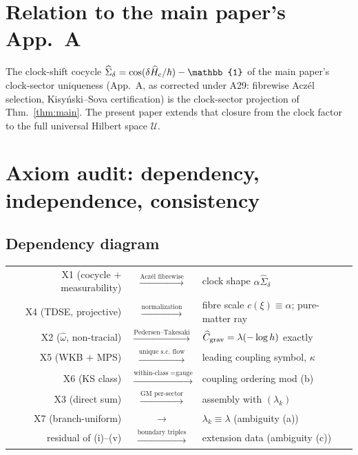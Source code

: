 \documentclass[11pt,a4paper]{article}
\theoremstyle{definition}
\theoremstyle{remark}
\newcommand{\id}{\mathbb{1}}
\begin{document}
\section{Relation to the main paper's App.~A}
\label{sec:vs-kisynski}

The clock-shift cocycle $\widehat\Sigma_\delta=
\cos(\delta\widehat H_{\rm c}/\hbar)-\id$ of the main paper's
clock-sector uniqueness (App.~A, as corrected under A29:
fibrewise Acz\'el selection, Kisy\'nski--Sova certification) is
the clock-sector projection of Thm.~\ref{thm:main}. The present
paper extends that closure from the clock factor to the full
universal Hilbert space $\mathcal U$.

\section{Axiom audit: dependency, independence,
consistency}\label{sec:audit}

\subsection*{Dependency diagram}

\begin{center}
\begin{tabular}{rcl}
X1 (cocycle $+$ measurability) & $\xrightarrow{\text{Acz\'el
fibrewise}}$ & clock shape $\alpha\widehat\Sigma_\delta$\\[2pt]
X4 (TDSE, projective) & $\xrightarrow{\text{normalization}}$ &
fibre scale $c(\xi)\equiv\alpha$; pure-matter ray\\[2pt]
X2 ($\hat\omega$, non-tracial) &
$\xrightarrow{\text{Pedersen--Takesaki}}$ &
$\widehat C_{\rm grav}=\lambda(-\log h)$ exactly\\[2pt]
X5 (WKB $+$ MPS) & $\xrightarrow{\text{unique s.c.\ flow}}$ &
leading coupling symbol, $\kappa$\\[2pt]
X6 (KS class) & $\xrightarrow{\text{within-class $=$
gauge}}$ & coupling ordering mod (b)\\[2pt]
X3 (direct sum) & $\xrightarrow{\text{GM per-sector}}$ &
assembly with $(\lambda_k)$\\[2pt]
X7 (branch-uniform) & $\xrightarrow{\phantom{xx}}$ &
$\lambda_k\equiv\lambda$ (ambiguity (a))\\[2pt]
residual of (i)--(v) & $\xrightarrow{\text{boundary
triples}}$ & extension data (ambiguity (c))
\end{tabular}
\end{center}
\end{document}
